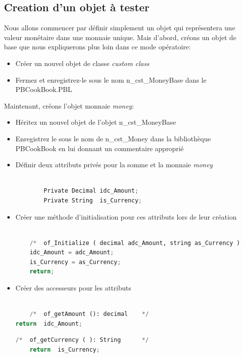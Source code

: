 \documentclass[french]{article}
\theoremstyle{definition}
\begin{document}
\subsection{Creation d'un objet à tester}
Nous allons commencer par définir simplement un objet  qui représentera une valeur monétaire dans une monnaie unique. 
Mais d'abord, créons un objet de base que nous expliquerons plus loin dans ce mode opératoire:
\begin{itemize}
    \item Créer un nouvel objet de classe \textit{custom class}
    \item Fermez et enregistrez-le sous le nom n\_cst\_MoneyBase dans le PBCookBook.PBL
\end{itemize}
Maintenant, créons l'objet monnaie \textit{money}:
\begin{itemize}
   \item Héritez un nouvel objet de l'objet n\_cst\_MoneyBase
    \item Enregistrez le sous le nom de n\_cst\_Money dans la bibliothèque PBCookBook en lui donnant un commentaire approprié
    \item  Définir deux attributs privés pour la somme et la monnaie \textit{money}

\begin{lstlisting}[language=Python, caption=variable d'instance de n\_cst\_money]
    
        Private Decimal	idc_Amount;
        Private String	is_Currency;

\end{lstlisting}
\item Créer une méthode d'initialisation pour ces attributs lors de leur création

\begin{lstlisting}[language=Python, caption=methode d'initialisation  de n\_cst\_money]
    
    /*	of_Initialize ( decimal adc_Amount, string as_Currency )	*/
    idc_Amount = adc_Amount;
    is_Currency = as_Currency;
    return;
\end{lstlisting}
\item  Créer des accesseurs pour les attributs
\begin{lstlisting}[language=Python, caption=accesseur pour recuperer la somme de l'objet \textit{money}]
    
    /*	of_getAmount (): decimal	*/
return	idc_Amount;

\end{lstlisting}
\begin{lstlisting}[language=Python, caption=accesseur pour recuperer la monnaie de l'objet \textit{money}]
    /*	of_getCurrency ( ): String		*/
    return	is_Currency;
    

\end{lstlisting}
\end{itemize}
\end{document}
